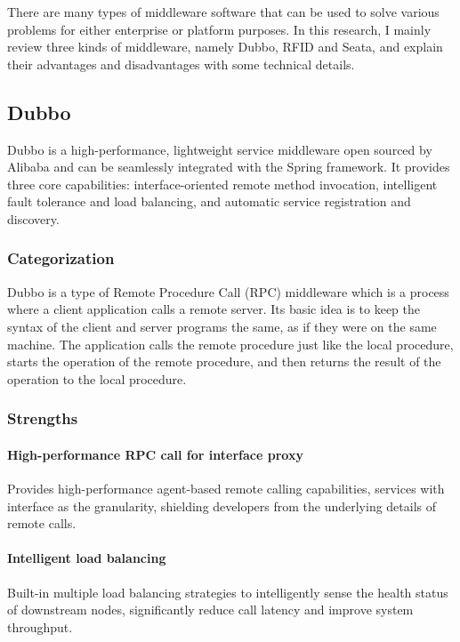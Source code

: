 \documentclass[conference]{IEEEtran}
\begin{document}
There are many types of middleware software that can be used to solve various problems for either enterprise or platform purposes. In this research, I mainly review three kinds of middleware, namely Dubbo, RFID and Seata, and explain their advantages and disadvantages with some technical details.

\subsection{Dubbo}

Dubbo is a high-performance, lightweight service middleware open sourced by Alibaba and can be seamlessly integrated with the Spring framework. It provides three core capabilities: interface-oriented remote method invocation, intelligent fault tolerance and load balancing, and automatic service registration and discovery.

\subsubsection{Categorization}

Dubbo is a type of Remote Procedure Call (RPC) middleware which is a process where a client application calls a remote server. Its basic idea is to keep the syntax of the client and server programs the same, as if they were on the same machine. The application calls the remote procedure just like the local procedure, starts the operation of the remote procedure, and then returns the result of the operation to the local procedure.

\subsubsection{Strengths}

\paragraph{High-performance RPC call for interface proxy}
Provides high-performance agent-based remote calling capabilities, services with interface as the granularity, shielding developers from the underlying details of remote calls.

\paragraph{Intelligent load balancing}
Built-in multiple load balancing strategies to intelligently sense the health status of downstream nodes, significantly reduce call latency and improve system throughput.
\end{document}
